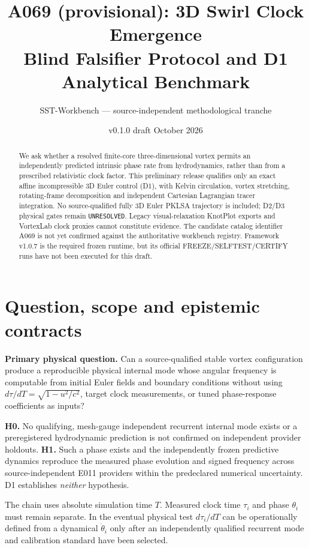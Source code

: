 \documentclass[10pt,a4paper]{article}
\title{A069 (provisional): 3D Swirl Clock Emergence\\
\large Blind Falsifier Protocol and D1 Analytical Benchmark}
\author{SST-Workbench --- source-independent methodological tranche}
\date{v0.1.0 draft \quad 16 October 2026}
\newcommand{\unresolved}{\texttt{UNRESOLVED}}
\begin{document}
\maketitle
\begin{abstract}
We ask whether a resolved finite-core three-dimensional vortex permits an independently predicted intrinsic phase rate from hydrodynamics, rather than from a prescribed relativistic clock factor. This preliminary release qualifies only an exact affine incompressible 3D Euler control (D1), with Kelvin circulation, vortex stretching, rotating-frame decomposition and independent Cartesian Lagrangian tracer integration. No source-qualified fully 3D Euler PKLSA trajectory is included; D2/D3 physical gates remain \unresolved. Legacy visual-relaxation KnotPlot exports and VortexLab clock proxies cannot constitute evidence. The candidate catalog identifier A069 is not yet confirmed against the authoritative workbench registry. Framework v1.0.7 is the required frozen runtime, but its official FREEZE/SELFTEST/CERTIFY runs have not been executed for this draft.
\end{abstract}

\section{Question, scope and epistemic contracts}
\textbf{Primary physical question.} Can a source-qualified stable vortex configuration produce a reproducible physical internal mode whose angular frequency is computable from initial Euler fields and boundary conditions without using $d\tau/dT=\sqrt{1-u^2/c^2}$, target clock measurements, or tuned phase-response coefficients as inputs?

\textbf{H0.} No qualifying, mesh-gauge independent recurrent internal mode exists or a preregistered hydrodynamic prediction is not confirmed on independent provider holdouts. \textbf{H1.} Such a phase exists and the independently frozen predictive dynamics reproduce the measured phase evolution and signed frequency across source-independent E011 providers within the predeclared numerical uncertainty. D1 establishes \emph{neither} hypothesis.

The chain uses absolute simulation time $T$. Measured clock time $\tau_i$ and phase $\theta_i$ must remain separate. In the eventual physical test $d\tau_i/dT$ can be operationally defined from a dynamical $\dot\theta_i$ only after an independently qualified recurrent mode and calibration standard have been selected.
\end{document}
